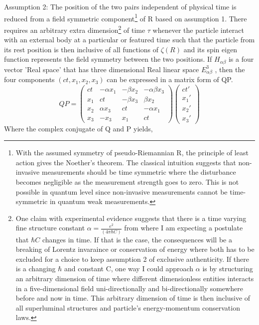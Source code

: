 \documentclass{article}
\begin{document}
Assumption 2:  The position of the two pairs independent of physical time is reduced from a field symmetric component\footnote{With the assumed symmetry of pseudo-Riemannian R, the principle of least action gives the Noether's theorem. The classical intuition suggests that non-invasive measurements should be time symmetric where  the disturbance becomes negligible as the measurement strength goes to zero\cite{6}. This is not possible in quantum level since non-invasive measurements cannot be time-symmetric in quantum weak measurements.} of R based on assumption 1. There requires an arbitrary extra dimension\footnote{One claim with experimental evidence\cite{7} suggests that there is a time varying fine structure constant $\alpha = \frac{e^2}{(4 \pi \hbar C )}$ from where I am expecting a postulate that $\hbar C$ changes in time. If that is the case, the consequences will be a breaking of Lorentz invaraince or conservation of energy where both has to be excluded for a choice to keep assumption 2 of exclusive authenticity. If there is a changing $\hbar$ and constant C, one way I could approach $\alpha$ is by structuring an arbitrary dimension of time where different dimensionless entities interacts in a five-dimensional field uni-directionally and bi-directionally somewhere before and now in time. This arbitrary dimension of time is then inclusive of all superluminal structures and particle's energy-momentum conservation laws.} of time $\tau$ whenever the particle interact with an external body at a particular or featured time such that the particle from its rest position is then inclusive of all functions of $\zeta(R)$ and its spin eigen function represents the field symmetry between the two positions. \vspace{4mm}\newline
If $H_{\alpha \beta}$ is a four vector 'Real space' that has three dimensional Real linear space $E_{\alpha \beta}^{3}$ , then the four components $(ct, x_1, x_2, x_3)$ can be expressed in a matrix form of QP.
\begin{equation}
    QP =
    \left(\begin{matrix}
ct & -\alpha x_1 & -\beta x_2 & -\alpha \beta x_3 \\
x_1 & ct & -\beta x_3 & \beta x_2 \\
x_2 & \alpha x_3 & ct & -\alpha x_1 \\
x_3 & -x_3 & x_1 & ct
\end{matrix}\right)
\left(\begin{matrix}
ct' \\
x_{1}'\\
x_{2}'\\
x_{3}'
\end{matrix}\right)
\end{equation} Where the complex conjugate of Q and P yields,
\end{document}
